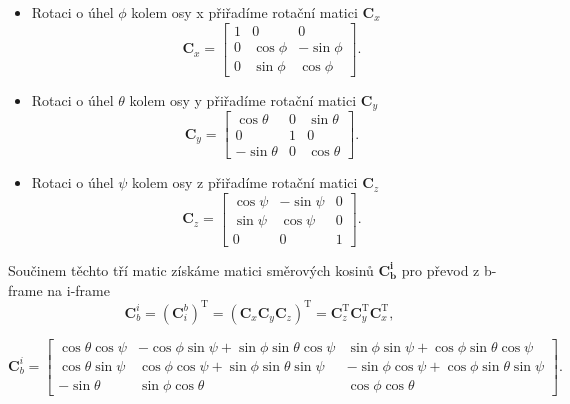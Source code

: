 \begin{itemize}
\item Rotaci o úhel $ \phi $ kolem osy x přiřadíme rotační matici $ \mathbf{C}_{x} $ \cite{Tittertonc2004}
\begin{equation}
\mathbf{C}_x=\left[\begin{array}{ccc}
1 & 0 & 0 \\
0 & \cos \phi & -\sin \phi \\
0 & \sin \phi & \cos \phi
\end{array}\right] .
\end{equation}

\item Rotaci o úhel $ \theta $ kolem osy y přiřadíme rotační matici $ \mathbf{C}_{y} $ \cite{Tittertonc2004}
\begin{equation}
\mathbf{C}_y=\left[\begin{array}{ccc}
\cos \theta & 0 & \sin \theta \\
0 & 1 & 0 \\
-\sin \theta & 0 & \cos \theta
\end{array}\right] .
\end{equation}

\item Rotaci o úhel $ \psi $ kolem osy z přiřadíme rotační matici $ \mathbf{C}_{z} $ \cite{Tittertonc2004}
\begin{equation}
\mathbf{C}_z=\left[\begin{array}{ccc}
\cos \psi & -\sin \psi & 0 \\
\sin \psi & \cos \psi & 0 \\
0 & 0 & 1
\end{array}\right] .
\end{equation} 

\end{itemize}

Součinem těchto tří matic získáme matici směrových kosinů $ \mathbf{C_{b}^{i}} $ pro převod z b-frame na i-frame \cite{Tittertonc2004}
\begin{equation}
\mathbf{C}_{b}^{i}= (\mathbf{C}_{i}^{b})^{\mathrm{T}} = (\mathbf{C}_{x}\mathbf{C}_{y}\mathbf{C}_{z})^{\mathrm{T}} = \mathbf{C}_{z}^{\mathrm{T}}\mathbf{C}_{y}^{\mathrm{T}}\mathbf{C}_{x}^{\mathrm{T}} ,
\end{equation}

\begin{equation}
\mathbf{C}_{b}^{i}=
\left[\begin{array}{ccc}
\cos \theta \cos \psi & -\cos \phi \sin \psi+\sin \phi \sin \theta \cos \psi & \sin \phi \sin \psi+\cos \phi \sin \theta \cos \psi \\
\cos \theta \sin \psi & \cos \phi \cos \psi+\sin \phi \sin \theta \sin \psi & -\sin \phi \cos \psi+\cos \phi \sin \theta \sin \psi \\
-\sin \theta & \sin \phi \cos \theta & \cos \phi \cos \theta
\end{array}\right] .
\end{equation}

